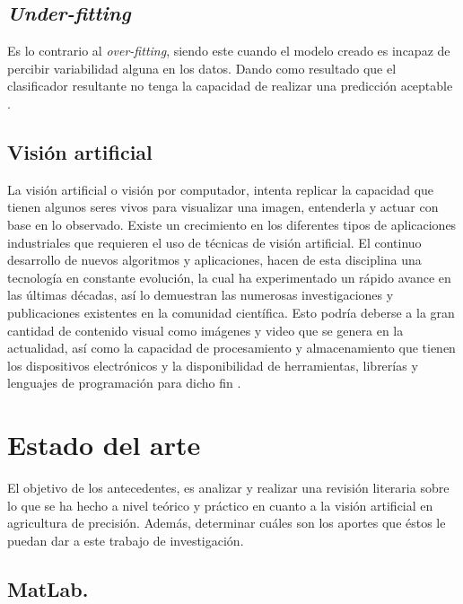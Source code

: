\section{\textit{Under-fitting}}

Es lo contrario al \textit{over-fitting}, siendo este cuando el modelo creado es incapaz de percibir variabilidad alguna en los datos. Dando como resultado que el clasificador resultante no tenga la capacidad de realizar una predicción aceptable \cite{jabbar2015methods}.

\section{Visión artificial} La visión artificial o visión por computador, intenta replicar la capacidad que tienen algunos seres vivos para visualizar una imagen, entenderla y actuar con base en lo observado. Existe un crecimiento en los diferentes tipos de aplicaciones industriales que requieren el uso de técnicas de visión artificial. El  continuo  desarrollo  de  nuevos  algoritmos  y  aplicaciones,  hacen  de  esta  disciplina  una tecnología en constante evolución, la cual ha experimentado un rápido avance en las últimas décadas, así lo demuestran las numerosas investigaciones y publicaciones existentes en la comunidad científica.  Esto podría deberse a la gran cantidad de contenido visual como imágenes y video que se genera en  la  actualidad,  así  como  la  capacidad  de  procesamiento  y  almacenamiento  que  tienen  los dispositivos electrónicos y la disponibilidad de herramientas, librerías y lenguajes de programación para dicho fin \cite{ref_15}.






\chapter{Estado del arte}

	El objetivo de los antecedentes, es analizar y realizar una revisión literaria sobre lo  que  se  ha hecho  a  nivel  teórico  y  práctico  en  cuanto a  la visión artificial en agricultura de precisión.  Además,  determinar  cuáles son los aportes que éstos le puedan dar a este trabajo de investigación.


\section{MatLab.}

